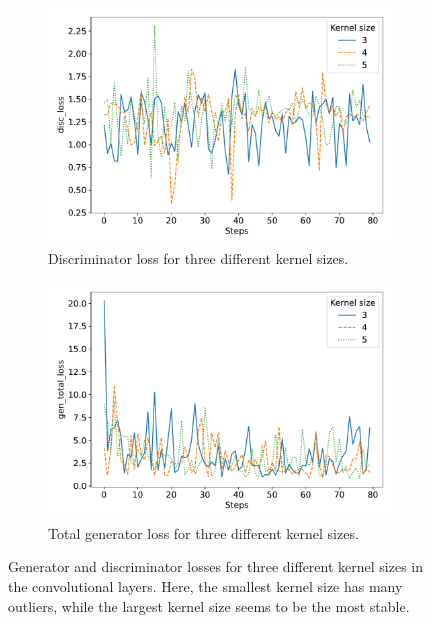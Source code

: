 \begin{figure}
	\centering
	\begin{subfigure}{\linewidth}
		\centering
		\includegraphics[width=\textwidth]{fig/analysis/Plot_Kernel_size_disc_loss.pdf}
		\caption{Discriminator loss for three different kernel sizes. }
		\label{fig:Plot_kernel_size_discloss}
	\end{subfigure}\hfill
	\begin{subfigure}{\linewidth}
		\centering
		\includegraphics[width=\textwidth]{fig/analysis/Plot_Kernel_size_gen_total_loss.pdf}
		\caption{Total generator loss for three different kernel sizes.}
		\label{fig:Plot_kernel_size_genloss}
	\end{subfigure}\hfill
	\caption{Generator and discriminator losses for three different kernel sizes in the convolutional layers. Here, the smallest kernel size has many outliers, while the largest kernel size seems to be the most stable.}
	\label{fig:Plot_kernel_size_loss}
\end{figure}
